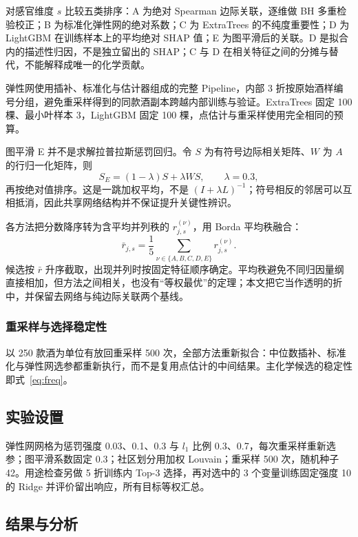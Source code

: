 \documentclass[UTF8,a4paper,zihao=-4]{ctexart}
\numberwithin{figure}{section}
\numberwithin{table}{section}
\numberwithin{equation}{section}
\begin{document}
对感官维度 $s$ 比较五类排序：A 为绝对 Spearman 边际关联，逐维做 BH 多重检验校正；B 为标准化弹性网的绝对系数；C 为 ExtraTrees 的不纯度重要性；D 为 LightGBM 在训练样本上的平均绝对 SHAP 值\cite{lundberg2017}；E 为图平滑后的关联。D 是拟合内的描述性归因，不是独立留出的 SHAP；C 与 D 在相关特征之间的分摊与替代，不能解释成唯一的化学贡献。

弹性网使用插补、标准化与估计器组成的完整 Pipeline，内部 3 折按原始酒样编号分组，避免重采样得到的同款酒副本跨越内部训练与验证。ExtraTrees 固定 100 棵、最小叶样本 3，LightGBM 固定 100 棵，点估计与重采样使用完全相同的预算。

图平滑 E 并不是求解拉普拉斯惩罚回归。令 $S$ 为有符号边际相关矩阵、$W$ 为 $A$ 的行归一化矩阵，则
\begin{equation}
S_{E}=(1-\lambda)S+\lambda WS,\qquad \lambda=0.3,
\label{eq:smooth}
\end{equation}
再按绝对值排序。这是一跳加权平均，不是 $(I+\lambda L)^{-1}$；符号相反的邻居可以互相抵消，因此共享网络结构并不保证提升关键性辨识。

各方法把分数降序转为含平均并列秩的 $r^{(\nu)}_{j,s}$，用 Borda 平均秩融合：
\begin{equation}
\bar r_{j,s}=\frac{1}{5}\sum_{\nu\in\{A,B,C,D,E\}}r^{(\nu)}_{j,s}.
\label{eq:borda}
\end{equation}
候选按 $\bar r$ 升序截取，出现并列时按固定特征顺序确定。平均秩避免不同归因量纲直接相加，但方法之间相关，也没有“等权最优”的定理；本文把它当作透明的折中，并保留去网络与纯边际关联两个基线。

\subsubsection{重采样与选择稳定性}

以 250 款酒为单位有放回重采样 500 次，全部方法重新拟合：中位数插补、标准化与弹性网选参都重新执行，而不是复用点估计的中间结果。主化学候选的稳定性即式~\eqref{eq:freq}。

\subsection{实验设置}

弹性网网格为惩罚强度 0.03、0.1、0.3 与 $l_1$ 比例 0.3、0.7，每次重采样重新选参；图平滑系数固定 0.3；社区划分用加权 Louvain；重采样 500 次，随机种子 42。用途检查另做 5 折训练内 Top-3 选择，再对选中的 3 个变量训练固定强度 10 的 Ridge 并评价留出响应，所有目标等权汇总。

\subsection{结果与分析}
\end{document}
